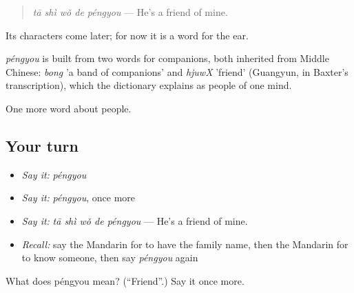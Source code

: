 \begin{quote}
\emph{tā shì wǒ de péngyou} — He's a friend of mine.
\end{quote}

Its characters come later; for now it is a word for the ear.

\begin{cousinweb}
\emph{péngyou} is built from two words for companions, both inherited from Middle Chinese: \emph{bong} 'a band of companions' and \emph{hjuwX} 'friend' (Guangyun, in Baxter's transcription), which the dictionary explains as people of one mind.
\end{cousinweb}

\begin{grammarlens}[title={What you've built}]
One more word about people.
\end{grammarlens}

\subsection*{Your turn}
\begin{itemize}
\raggedright
  \item \emph{Say it:} \emph{péngyou}
  \item \emph{Say it:} \emph{péngyou}, once more
  \item \emph{Say it:} \emph{tā shì wǒ de péngyou} — He's a friend of mine.
  \item \emph{Recall:} say the Mandarin for to have the family name, then the Mandarin for to know someone, then say \emph{péngyou} again
\end{itemize}

\begin{tcolorbox}[breakable,colback=teal!4,colframe=teal!35!black,title={Before you move on}]
What does péngyou mean? (\textquotedblleft{}Friend\textquotedblright{}.) Say it once more.
\end{tcolorbox}
